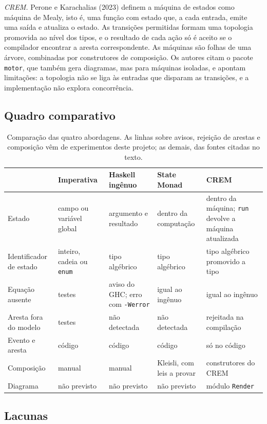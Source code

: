 \documentclass[12pt,a4paper]{article}
\begin{document}
\textit{CREM.} Perone e Karachalias (2023) definem a máquina de estados como máquina de Mealy, isto é, uma função com estado que, a cada entrada, emite uma saída e atualiza o estado. As transições permitidas formam uma topologia promovida ao nível dos tipos, e o resultado de cada ação só é aceito se o compilador encontrar a aresta correspondente. As máquinas são folhas de uma árvore, combinadas por construtores de composição. Os autores citam o pacote \texttt{motor}, que também gera diagramas, mas para máquinas isoladas, e apontam limitações: a topologia não se liga às entradas que disparam as transições, e a implementação não explora concorrência.

\subsection{Quadro comparativo}

\begin{table}[h]
\centering
\footnotesize
\begin{tabular}{|p{2.5cm}|p{2.7cm}|p{2.7cm}|p{2.7cm}|p{3.0cm}|}
\hline
 & Imperativa & Haskell ingênuo & State Monad & CREM \\
\hline
Estado & campo ou variável global & argumento e resultado & dentro da computação & dentro da máquina; \texttt{run} devolve a máquina atualizada \\
\hline
Identificador de estado & inteiro, cadeia ou \texttt{enum} & tipo algébrico & tipo algébrico & tipo algébrico promovido a tipo \\
\hline
Equação ausente & testes & aviso do GHC; erro com \texttt{-Werror} & igual ao ingênuo & igual ao ingênuo \\
\hline
Aresta fora do modelo & testes & não detectada & não detectada & rejeitada na compilação \\
\hline
Evento e aresta & código & código & código & só no código \\
\hline
Composição & manual & manual & Kleisli, com leis a provar & construtores do CREM \\
\hline
Diagrama & não previsto & não previsto & não previsto & módulo \texttt{Render} \\
\hline
\end{tabular}
\caption{Comparação das quatro abordagens. As linhas sobre avisos, rejeição de arestas e composição vêm de experimentos deste projeto; as demais, das fontes citadas no texto.}
\end{table}

\subsection{Lacunas}
\end{document}
